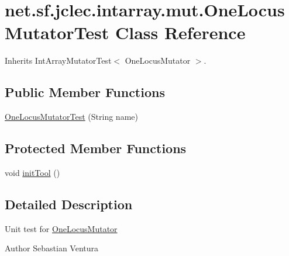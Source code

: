 \hypertarget{classnet_1_1sf_1_1jclec_1_1intarray_1_1mut_1_1_one_locus_mutator_test}{\section{net.\-sf.\-jclec.\-intarray.\-mut.\-One\-Locus\-Mutator\-Test Class Reference}
\label{classnet_1_1sf_1_1jclec_1_1intarray_1_1mut_1_1_one_locus_mutator_test}
}


Inherits Int\-Array\-Mutator\-Test$<$ One\-Locus\-Mutator $>$.

\subsection*{Public Member Functions}
\begin{DoxyCompactItemize}
\item 
\hyperlink{classnet_1_1sf_1_1jclec_1_1intarray_1_1mut_1_1_one_locus_mutator_test_a9da85b7168981ebb2292405cb6e21c53}{One\-Locus\-Mutator\-Test} (String name)
\end{DoxyCompactItemize}
\subsection*{Protected Member Functions}
\begin{DoxyCompactItemize}
\item 
void \hyperlink{classnet_1_1sf_1_1jclec_1_1intarray_1_1mut_1_1_one_locus_mutator_test_ad9c815bd7eb9872f197a53cf6988a462}{init\-Tool} ()
\end{DoxyCompactItemize}


\subsection{Detailed Description}
Unit test for \hyperlink{classnet_1_1sf_1_1jclec_1_1intarray_1_1mut_1_1_one_locus_mutator}{One\-Locus\-Mutator}

\begin{DoxyAuthor}{Author}
Sebastian Ventura 
\end{DoxyAuthor}


